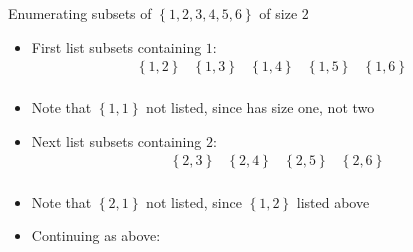 \documentclass[handout]{beamer}
\theoremstyle{definition}
\begin{document}
\begin{frame}{Enumerating subsets of $\left\{1,2,3,4,5,6\right\}$ of size $2$}
\begin{itemize}
\item First list subsets containing $1$:
\[\begin{array}{ccccc}
\left\{1,2\right\}&\left\{1,3\right\}&\left\{1,4\right\}&\left\{1,5\right\}
  &\left\{1,6\right\}\\
\end{array}\]
\item Note that $\left\{1,1\right\}$ not listed, since has size one, not two
\item Next list subsets containing $2$:
\[\begin{array}{ccccc}
&\left\{2,3\right\}&\left\{2,4\right\}&\left\{2,5\right\}&\left\{2,6\right\}\\
\end{array}\]
\item Note that $\left\{2,1\right\}$ not listed, since $\left\{1,2\right\}$
listed above
\item Continuing as above:
\end{itemize}
\end{frame}
\end{document}
